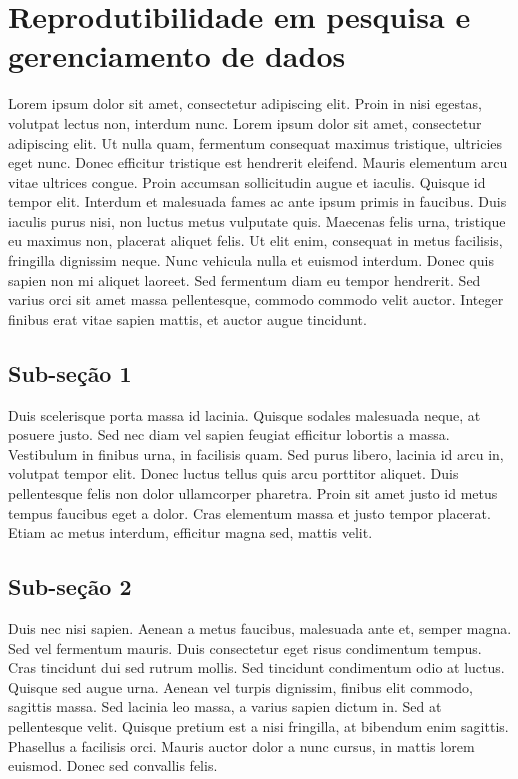 \documentclass[]{book}
\begin{document}
\hypertarget{reprodutibilidade-em-pesquisa-e-gerenciamento-de-dados}{%
\chapter{Reprodutibilidade em pesquisa e gerenciamento de dados}\label{reprodutibilidade-em-pesquisa-e-gerenciamento-de-dados}}

Lorem ipsum dolor sit amet, consectetur adipiscing elit. Proin in nisi egestas, volutpat lectus non, interdum nunc. Lorem ipsum dolor sit amet, consectetur adipiscing elit. Ut nulla quam, fermentum consequat maximus tristique, ultricies eget nunc. Donec efficitur tristique est hendrerit eleifend. Mauris elementum arcu vitae ultrices congue. Proin accumsan sollicitudin augue et iaculis. Quisque id tempor elit. Interdum et malesuada fames ac ante ipsum primis in faucibus. Duis iaculis purus nisi, non luctus metus vulputate quis. Maecenas felis urna, tristique eu maximus non, placerat aliquet felis. Ut elit enim, consequat in metus facilisis, fringilla dignissim neque. Nunc vehicula nulla et euismod interdum. Donec quis sapien non mi aliquet laoreet. Sed fermentum diam eu tempor hendrerit. Sed varius orci sit amet massa pellentesque, commodo commodo velit auctor. Integer finibus erat vitae sapien mattis, et auctor augue tincidunt.

\hypertarget{sub-seuxe7uxe3o-1-7}{%
\section{Sub-seção 1}\label{sub-seuxe7uxe3o-1-7}}

Duis scelerisque porta massa id lacinia. Quisque sodales malesuada neque, at posuere justo. Sed nec diam vel sapien feugiat efficitur lobortis a massa. Vestibulum in finibus urna, in facilisis quam. Sed purus libero, lacinia id arcu in, volutpat tempor elit. Donec luctus tellus quis arcu porttitor aliquet. Duis pellentesque felis non dolor ullamcorper pharetra. Proin sit amet justo id metus tempus faucibus eget a dolor. Cras elementum massa et justo tempor placerat. Etiam ac metus interdum, efficitur magna sed, mattis velit.

\hypertarget{sub-seuxe7uxe3o-2-7}{%
\section{Sub-seção 2}\label{sub-seuxe7uxe3o-2-7}}

Duis nec nisi sapien. Aenean a metus faucibus, malesuada ante et, semper magna. Sed vel fermentum mauris. Duis consectetur eget risus condimentum tempus. Cras tincidunt dui sed rutrum mollis. Sed tincidunt condimentum odio at luctus. Quisque sed augue urna. Aenean vel turpis dignissim, finibus elit commodo, sagittis massa. Sed lacinia leo massa, a varius sapien dictum in. Sed at pellentesque velit. Quisque pretium est a nisi fringilla, at bibendum enim sagittis. Phasellus a facilisis orci. Mauris auctor dolor a nunc cursus, in mattis lorem euismod. Donec sed convallis felis.
\end{document}
